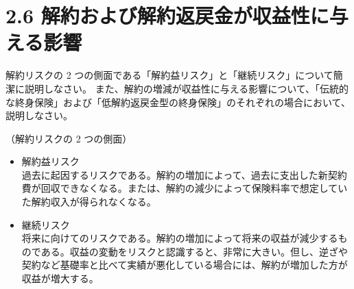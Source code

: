 \documentclass[report,gutter=10mm,fore-edge=10mm,uplatex,dvipdfmx]{jlreq}
\begin{document}
\section{2.6 解約および解約返戻金が収益性に与える影響}


解約リスクの 2 つの側面である「解約益リスク」と「継続リスク」について簡潔に説明しなさい。
また、解約の増減が収益性に与える影響について、「伝統的な終身保険」および「低解約返戻金型の終身保険」のそれぞれの場合において、説明しなさい。


（解約リスクの 2 つの側面）
\begin{itemize}
 \item 解約益リスク\\
       過去に起因するリスクである。解約の増加によって、過去に支出した新契約費が回収できなくなる。または、解約の減少によって保険料率で想定していた解約収入が得られなくなる。   
 \item 継続リスク\\
       将来に向けてのリスクである。解約の増加によって将来の収益が減少するものである。収益の変動をリスクと認識すると、非常に大きい。但し、逆ざや契約など基礎率と比べて実績が悪化している場合には、解約が増加した方が収益が増大する。
\end{itemize}
\end{document}
